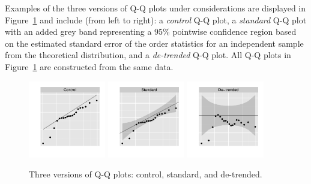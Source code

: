 \documentclass{article}\usepackage[]{graphicx}\usepackage[]{color}
\newcommand{\alnote}[1]{\todo[inline,color=green!40]{#1}}
\begin{document}
Examples of the three versions of Q-Q plots under considerations are displayed in Figure~\ref{qqplots} and include (from left to right): a \emph{control} Q-Q plot, a \emph{standard} Q-Q plot with an added grey band representing a 95\% pointwise confidence region \citep{Davison:1997}
based on the estimated standard error of the order statistics for an independent sample from the theoretical distribution, and a \emph{de-trended} Q-Q plot. All Q-Q plots in Figure~\ref{qqplots} are constructed from the same data. 

\begin{figure}
\centering
\includegraphics[width=0.3\textwidth]{qqplots1}
\includegraphics[width=0.3\textwidth]{qqplots2}
\includegraphics[width=0.3\textwidth]{qqplots3}
\caption{ \label{qqplots} Three versions of Q-Q plots: control, standard, and de-trended.}
\end{figure}
\end{document}

